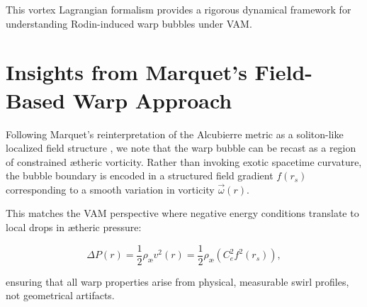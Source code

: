\documentclass[12pt]{article}
\begin{document}
This vortex Lagrangian formalism provides a rigorous dynamical framework for understanding Rodin-induced warp bubbles under VAM.

\section{Insights from Marquet's Field-Based Warp Approach}

Following Marquet's reinterpretation of the Alcubierre metric as a soliton-like localized field structure \cite{marquet2012warp}, we note that the warp bubble can be recast as a region of constrained ætheric vorticity. Rather than invoking exotic spacetime curvature, the bubble boundary is encoded in a structured field gradient $f(r_s)$ corresponding to a smooth variation in vorticity $\vec{\omega}(r)$.

This matches the VAM perspective where negative energy conditions translate to local drops in ætheric pressure:

\begin{equation}
    \Delta P(r) = \frac{1}{2} \rho_\text{\ae} v^2(r) = \frac{1}{2} \rho_\text{\ae} (C_e^2 f^2(r_s)),
\end{equation}

ensuring that all warp properties arise from physical, measurable swirl profiles, not geometrical artifacts.


    
\end{document}
